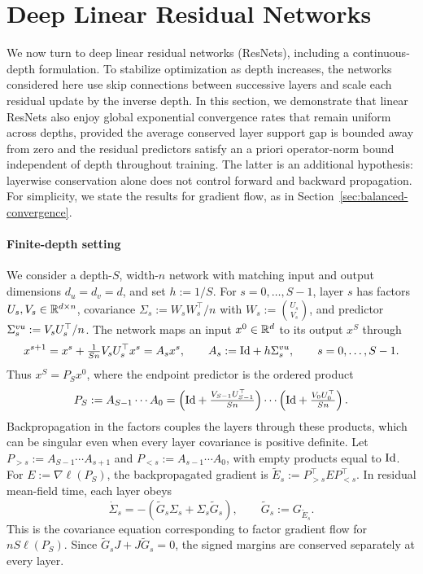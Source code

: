 \section{Deep Linear Residual Networks}
\label{sec:resnets}\label{sec:deep-resnets}
We now turn to deep linear residual networks (ResNets), including a continuous-depth formulation.
To stabilize optimization as depth increases, the networks considered here use skip connections between successive layers and scale each residual update by the inverse depth.
In this section, we demonstrate that linear ResNets also enjoy global exponential convergence rates that remain uniform across depths,
provided the average conserved layer support gap is bounded away from zero and the residual predictors satisfy an a priori operator-norm bound independent of depth throughout training.
The latter is an additional hypothesis: layerwise conservation alone does not control forward and backward propagation.
For simplicity, we state the results for gradient flow, as in Section~\ref{sec:balanced-convergence}.

\paragraph{Finite-depth setting}
We consider a depth-$S$, width-$n$ network with matching input and output dimensions $d_u=d_v=d$, and set $h:=1/S$.
For $s=0,\ldots,S-1$, layer $s$ has factors $U_s,V_s\in\mathbb{R}^{d\times n}$, covariance $\Sigma_s:=W_sW_s^\top/n$ with $W_s:=\binom{U_s}{V_s}$, and predictor $\Sigma^{vu}_s:=V_sU_s^\top/n$.
The network maps an input $x^0\in\mathbb{R}^d$ to its output $x^S$ through
\[
 x^{s+1}=x^s+\tfrac{1}{Sn}V_sU_s^\top x^s=A_sx^s, \qquad A_s:=\mathrm{Id}+h\Sigma^{vu}_s,\qquad s=0,\ldots,S-1.
\]
Thus $x^S=P_Sx^0$, where the endpoint predictor is the ordered product
\[
 P_S:=A_{S-1}\cdots A_0
 =\left(\mathrm{Id}+\tfrac{V_{S-1}U_{S-1}^\top}{Sn}\right)\cdots
  \left(\mathrm{Id}+\tfrac{V_0U_0^\top}{Sn}\right).
\]
Backpropagation in the factors couples the layers through these products, which can be singular even when every layer covariance is positive definite.
Let $P_{>s}:=A_{S-1}\cdots A_{s+1}$ and $P_{<s}:=A_{s-1}\cdots A_0$, with empty products equal to $\mathrm{Id}$.
For $E:=\nabla\ell(P_S)$, the backpropagated gradient is $\widetilde E_s:=P_{>s}^\top E P_{<s}^\top$.
In residual mean-field time, each layer obeys
\begin{equation}\label{eq:resnet-layer-bures}
 \dot\Sigma_s=-(\widetilde G_s\Sigma_s+\Sigma_s\widetilde G_s),
 \qquad \widetilde G_s:=G_{\widetilde E_s}.
\end{equation}
This is the covariance equation corresponding to factor gradient flow for $nS\ell(P_S)$. Since $\widetilde G_sJ+J\widetilde G_s=0$,
the signed margins are conserved separately at every layer.

